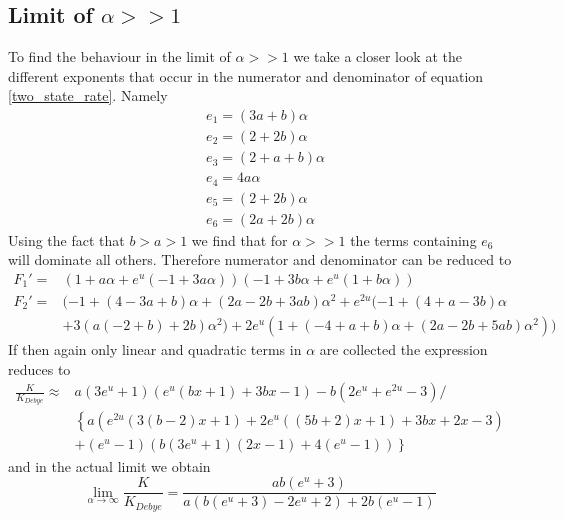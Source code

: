 \subsection{Limit of $\alpha >> 1$}
To find the behaviour in the limit of $\alpha >>1$ we take a closer look at the different exponents that occur in the numerator and denominator of equation \eqref{two_state_rate}. Namely
\begin{align}
& e_1 = (3a+b)\alpha \nonumber \\
& e_2 = (2+2b)\alpha \nonumber \\
& e_3 = (2+a+b)\alpha \nonumber \\
& e_4 = 4a\alpha \nonumber \\
& e_5 = (2+2b)\alpha \nonumber \\
& e_6 = (2a+2b)\alpha
\end{align}
Using the fact that $b > a > 1$ we find that for $\alpha >>1$ the terms containing $e_6$ will dominate all others. Therefore numerator and denominator can be reduced to
\begin{align*}
    F_1' =& ( 1 + a \alpha + e^u (-1 + 3 a \alpha)) (-1 + 3 b \alpha + e^u (1 + b \alpha))\\
    F_2' =& (-1 + (4 - 3 a + b) \alpha + (2 a - 2 b + 3 a b) \alpha^2 + e^{2 u} (-1 + (4 + a - 3 b) \alpha \\
          &+ 3 (a (-2 + b) + 2 b) \alpha^2) + 2 e^u (1 + (-4 + a + b) \alpha + (2 a - 2 b + 5 a b) \alpha^2))
\end{align*}
If then again only linear and quadratic terms in $\alpha$ are collected the expression reduces to 
\begin{align}
    \frac{K}{K_{Debye}} \approx &a \left(3 e^u+1\right) \left(e^u (b x+1)+3 b x-1\right)-b \left(2 e^u+e^{2 u}-3\right) / \nonumber \\
                          &\left\{a \left(e^{2 u} (3 (b-2) x+1)+2 e^u ((5 b+2) x+1)+3 b x+2 x-3\right) \right.  \nonumber \\
                          & \left. +\left(e^u-1\right) \left(b \left(3 e^u+1\right) (2 x-1)+4 \left(e^u-1\right)\right) \right\}
    \label{kla}
\end{align}
and in the actual limit we obtain 
\begin{equation}
    \lim_{\alpha \rightarrow \infty} \frac{K}{K_{Debye}} = \frac{a b \left(e^u+3\right)}{a \left(b \left(e^u+3\right)-2 e^u+2\right)+2 b \left(e^u-1\right)}
    \label{kliminfa}
\end{equation}
